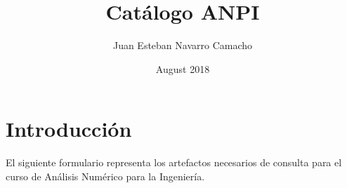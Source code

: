 \documentclass[a4paper,12pt,twoside]{book}
\title{Catálogo ANPI}
\author{Juan Esteban Navarro Camacho }
\date{August 2018}
\begin{document}
\maketitle
\section{Introducción}
El siguiente formulario representa los artefactos necesarios de consulta para el curso de Análisis Numérico para la Ingeniería.





\end{document}
